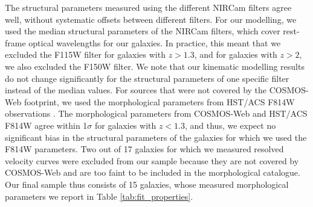 \documentclass{aa}
\begin{document}
The structural parameters measured using the different NIRCam filters agree well, without systematic offsets between different filters. For our modelling, we used the median structural parameters of the NIRCam filters, which cover rest-frame optical wavelengths for our galaxies. In practice, this meant that we excluded the F115W filter for galaxies with $z>1.3$, and for galaxies with $z>2$, we also excluded the F150W filter.
We note that our kinematic modelling results do not change significantly for the structural parameters of one specific filter instead of the median values. For sources that were not covered by the COSMOS-Web footprint, we used the morphological parameters from HST/ACS F814W observations \citep{RGriffith2012}. The morphological parameters from COSMOS-Web and HST/ACS F814W agree within 1$\sigma$ for galaxies with $z<1.3$, and thus, we expect no significant bias in the structural parameters of the galaxies for which we used the F814W parameters.
Two out of 17 galaxies for which we measured resolved velocity curves were excluded from our sample because they are not covered by COSMOS-Web and are too faint to be included in the \citet{RGriffith2012} morphological catalogue. Our final sample thus consists of 15 galaxies, whose measured morphological parameters we report in Table \ref{tab:fit_properties}.
\end{document}
